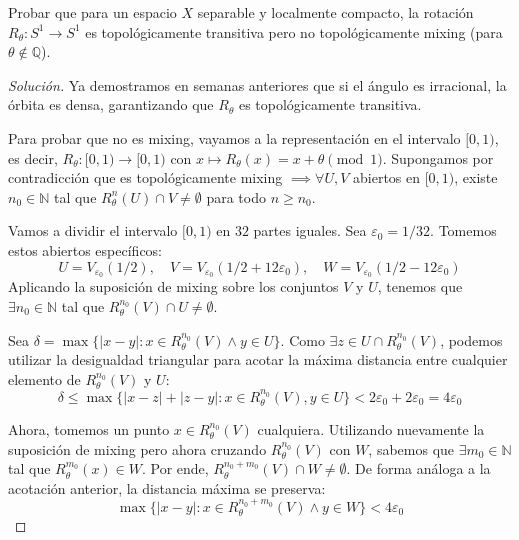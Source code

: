 \begin{ejercicio}
	Probar que para un espacio $X$ separable y localmente compacto, la rotación $R_\theta: S^1 \to S^1$ es topológicamente transitiva pero no topológicamente mixing (para $\theta \notin \mathbb{Q}$).
\end{ejercicio}
\begin{proof}[Solución]
	Ya demostramos en semanas anteriores que si el ángulo es irracional, la órbita es densa, garantizando que $R_\theta$ es topológicamente transitiva.
	
	Para probar que no es mixing, vayamos a la representación en el intervalo $[0,1)$, es decir, $R_\theta: [0,1) \to [0,1)$ con $x \mapsto R_\theta(x) = x + \theta \pmod 1$.
	Supongamos por contradicción que es topológicamente mixing $\implies \forall U, V$ abiertos en $[0,1)$, existe $n_0 \in \mathbb{N}$ tal que $R_\theta^n(U) \cap V \neq \emptyset$ para todo $n \ge n_0$.
	
	Vamos a dividir el intervalo $[0,1)$ en $32$ partes iguales. Sea $\varepsilon_0 = 1/32$. Tomemos estos abiertos específicos:
	$$ U = V_{\varepsilon_0}(1/2), \quad V = V_{\varepsilon_0}(1/2 + 12\varepsilon_0), \quad W = V_{\varepsilon_0}(1/2 - 12\varepsilon_0) $$
	Aplicando la suposición de mixing sobre los conjuntos $V$ y $U$, tenemos que $\exists n_0 \in \mathbb{N}$ tal que $R_\theta^{n_0}(V) \cap U \neq \emptyset$.
	
	Sea $\delta = \max\{|x-y| : x \in R_\theta^{n_0}(V) \land y \in U\}$. 
	Como $\exists z \in U \cap R_\theta^{n_0}(V)$, podemos utilizar la desigualdad triangular para acotar la máxima distancia entre cualquier elemento de $R_\theta^{n_0}(V)$ y $U$:
	$$ \delta \le \max\{|x-z| + |z-y| : x \in R_\theta^{n_0}(V), y \in U\} < 2\varepsilon_0 + 2\varepsilon_0 = 4\varepsilon_0 $$
	
	Ahora, tomemos un punto $x \in R_\theta^{n_0}(V)$ cualquiera. Utilizando nuevamente la suposición de mixing pero ahora cruzando $R_\theta^{n_0}(V)$ con $W$, sabemos que $\exists m_0 \in \mathbb{N}$ tal que $R_\theta^{m_0}(x) \in W$. 
	Por ende, $R_\theta^{n_0+m_0}(V) \cap W \neq \emptyset$. De forma análoga a la acotación anterior, la distancia máxima se preserva:
	$$ \max\{|x-y| : x \in R_\theta^{n_0+m_0}(V) \land y \in W\} < 4\varepsilon_0 $$
	

\end{proof}
